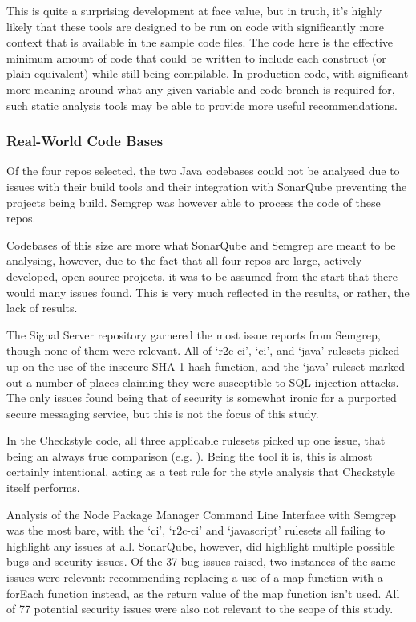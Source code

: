 \documentclass{article}
\begin{document}
            This is quite a surprising development at face value, but in truth, it's highly likely that these tools are designed to be run on code with significantly more context that is available in the sample code files. The code here is the effective minimum amount of code that could be written to include each construct (or plain equivalent) while still being compilable. In production code, with significant more meaning around what any given variable and code branch is required for, such static analysis tools may be able to provide more useful recommendations.
        \subsubsection{Real-World Code Bases}
            Of the four repos selected, the two Java codebases could not be analysed due to issues with their build tools and their integration with SonarQube preventing the projects being build. Semgrep was however able to process the code of these repos.

            Codebases of this size are more what SonarQube and Semgrep are meant to be analysing, however, due to the fact that all four repos are large, actively developed, open-source projects, it was to be assumed from the start that there would many issues found. This is very much reflected in the results, or rather, the lack of results.

            The Signal Server repository garnered the most issue reports from Semgrep, though none of them were relevant. All of `r2c-ci', `ci', and `java' rulesets picked up on the use of the insecure SHA-1 hash function, and the `java' ruleset marked out a number of places claiming they were susceptible to SQL injection attacks. The only issues found being that of security is somewhat ironic for a purported secure messaging service, but this is not the focus of this study.

            In the Checkstyle code, all three applicable rulesets picked up one issue, that being an always true comparison (e.g. ). Being the tool it is, this is almost certainly intentional, acting as a test rule for the style analysis that Checkstyle itself performs.

            Analysis of the Node Package Manager Command Line Interface with Semgrep was the most bare, with the `ci', `r2c-ci' and `javascript' rulesets all failing to highlight any issues at all. SonarQube, however, did highlight multiple possible bugs and security issues. Of the 37 bug issues raised, two instances of the same issues were relevant: recommending replacing a use of a map function with a forEach function instead, as the return value of the map function isn't used. All of 77 potential security issues were also not relevant to the scope of this study.
\end{document}
